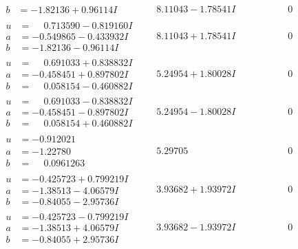 \documentclass[1p]{elsarticle_modified}
\theoremstyle{definition}
\begin{document}
$$\begin{array}{c|c|c}
\begin{aligned}
b &= -1.82136 + 0.96114 I\end{aligned}
 & \phantom{-}8.11043 - 1.78541 I & \phantom{-0.000000 } 0 \\ \hline\begin{aligned}
u &= \phantom{-}0.713590 - 0.819160 I \\
a &= -0.549865 - 0.433932 I \\
b &= -1.82136 - 0.96114 I\end{aligned}
 & \phantom{-}8.11043 + 1.78541 I & \phantom{-0.000000 } 0 \\ \hline\begin{aligned}
u &= \phantom{-}0.691033 + 0.838832 I \\
a &= -0.458451 + 0.897802 I \\
b &= \phantom{-}0.058154 - 0.460882 I\end{aligned}
 & \phantom{-}5.24954 + 1.80028 I & \phantom{-0.000000 } 0 \\ \hline\begin{aligned}
u &= \phantom{-}0.691033 - 0.838832 I \\
a &= -0.458451 - 0.897802 I \\
b &= \phantom{-}0.058154 + 0.460882 I\end{aligned}
 & \phantom{-}5.24954 - 1.80028 I & \phantom{-0.000000 } 0 \\ \hline\begin{aligned}
u &= -0.912021\phantom{ +0.000000I} \\
a &= -1.22780\phantom{ +0.000000I} \\
b &= \phantom{-}0.0961263\phantom{ +0.000000I}\end{aligned}
 & \phantom{-}5.29705\phantom{ +0.000000I} & \phantom{-0.000000 } 0 \\ \hline\begin{aligned}
u &= -0.425723 + 0.799219 I \\
a &= -1.38513 - 4.06579 I \\
b &= -0.84055 - 2.95736 I\end{aligned}
 & \phantom{-}3.93682 + 1.93972 I & \phantom{-0.000000 } 0 \\ \hline\begin{aligned}
u &= -0.425723 - 0.799219 I \\
a &= -1.38513 + 4.06579 I \\
b &= -0.84055 + 2.95736 I\end{aligned}
 & \phantom{-}3.93682 - 1.93972 I & \phantom{-0.000000 } 0 \\ \hline\begin{aligned}

\end{aligned}
\end{array}$$
\end{document}
